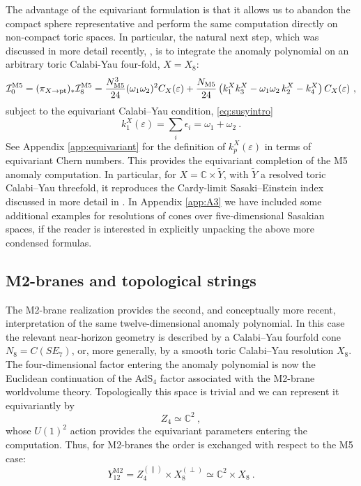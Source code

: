 \documentclass[11pt,a4paper]{article}
\def\cI{{\cal I}}
\theoremstyle{definition}
\theoremstyle{identity}
\theoremstyle{remark}
\newcommand{\be}{\begin{equation}}
\newcommand{\ee}{\end{equation}}
\newcommand{\e}{\epsilon}
\newcommand{\BC}{\mathbb{C}}
\begin{document}
The advantage of the equivariant formulation is that it allows us to abandon the compact sphere
representative and perform the same computation directly on non-compact toric spaces. In
particular, the natural next step, which was discussed in more detail recently, \cite{Hristov:2026tde}, is to integrate the anomaly polynomial on an arbitrary toric Calabi-Yau four-fold, $X = X_8$:
\be
\label{eq:PT8general}
\cI_0^{\rm M5}
=
(\pi_{X\rightarrow {\rm pt}})_*
\cI_8^{\rm M5}
=
\frac{N_\text{M5}^3}{24}
(\omega_1\omega_2)^2 C_X(\varepsilon)
+
\frac{N_\text{M5}}{24}
\left(
k_1^X k_3^X
-
\omega_1\omega_2\,k_2^X
-
k_4^X
\right)
C_X(\varepsilon)\ ,
\ee
subject to the equivariant Calabi--Yau condition, \eqref{eq:susyintro}
\be
\label{eq:susycond}
k_1^X(\varepsilon)= \sum_i \e_i=\omega_1+\omega_2\ .
\ee
See Appendix \ref{app:equivariant} for the definition of $k_p^X(\varepsilon)$ in terms of equivariant Chern numbers.
This provides the equivariant completion of the M5 anomaly computation. In particular, for
$X=\mathbb C\times \tilde Y$, with $\tilde Y$ a resolved toric Calabi--Yau threefold, it reproduces the
Cardy-limit Sasaki--Einstein index discussed in more detail in
\cite{Hristov:2026tde}. In Appendix \ref{app:A3} we have included some additional examples for resolutions of cones over five-dimensional Sasakian spaces, if the reader is interested in explicitly unpacking the above more condensed formulas.

\subsection{M2-branes and topological strings}
\label{sec:M2}

The M2-brane realization provides the second, and conceptually more recent, interpretation of
the same twelve-dimensional anomaly polynomial. In this case the relevant near-horizon geometry
is described by a Calabi--Yau fourfold cone $N_8=C(SE_7)$,
or, more generally, by a smooth toric Calabi--Yau resolution $X_8$. The four-dimensional factor
entering the anomaly polynomial is now the Euclidean continuation of the AdS$_4$ factor
associated with the M2-brane worldvolume theory. Topologically this space is trivial and we can
represent it equivariantly by
\be
Z_4\simeq \BC^2\ ,
\ee
whose $U(1)^2$ action provides the equivariant parameters entering the computation. Thus, for M2-branes the order is exchanged with respect to the M5 case:
\be
Y_{12}^\text{M2}=Z_4^{(\parallel)}\times X_8^{(\perp)}
\simeq
\BC^2\times X_8\ .
\ee
\end{document}
